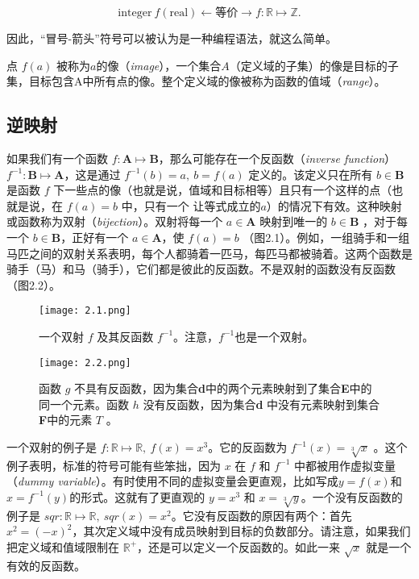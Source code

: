 \documentclass[lang=cn,12pt]{elegantbook}
\begin{document}
$$\text{integer} \ f(\text{real}) \leftarrow \text{等价} \rightarrow f : \mathbb{R} \mapsto \mathbb{Z}.$$

因此，“冒号-箭头”符号可以被认为是一种编程语法，就这么简单。

点 $f(a)$ 被称为$a$的像（\textit{image}），一个集合$A$（定义域的子集）的像是目标的子集，目标包含A中所有点的像。整个定义域的像被称为函数的值域（\textit{range}）。

\subsection{逆映射}

如果我们有一个函数 $f : \textbf{A} \mapsto \textbf{B}$，那么可能存在一个反函数（\textit{inverse function}） $f^{-1} : \textbf{B} \mapsto \textbf{A}$，这是通过 $ f^{-1}(b) = a,\ b = f(a)$ 定义的。该定义只在所有 $b \in \textbf{B}$是函数 $f$ 下一些点的像（也就是说，值域和目标相等）且只有一个这样的点（也就是说，在 $f(a) = b$ 中，只有一个 让等式成立的$a$）的情况下有效。这种映射或函数称为双射（\textit{bijection}）。双射将每一个 $a \in \textbf{A}$ 映射到唯一的 $b \in \textbf{B}$ ，对于每一个 $b \in \textbf{B}$，正好有一个 $a \in \textbf{A}$，使 $f(a)=b$ （图2.1）。例如，一组骑手和一组马匹之间的双射关系表明，每个人都骑着一匹马，每匹马都被骑着。这两个函数是骑手（马）和马（骑手），它们都是彼此的反函数。不是双射的函数没有反函数（图2.2）。

\begin{figure}[htb]
  \centering
  \begin{minipage}[t]{0.4\textwidth}
    \centering
    \texttt{[image: 2.1.png]}
    \caption{一个双射 $f$ 及其反函数 $f^{-1}$。注意，$f^{-1}$也是一个双射。}
  \end{minipage}
  \hspace*{2em}
  \begin{minipage}[t]{0.4\textwidth}
    \centering
    \texttt{[image: 2.2.png]}
    \caption{函数 $g$ 不具有反函数，因为集合\textbf{d}中的两个元素映射到了集合\textbf{E}中的同一个元素。函数 $h$ 没有反函数，因为集合\textbf{d} 中没有元素映射到集合\textbf{F}中的元素 $T$ 。}
  \end{minipage}
\end{figure}

一个双射的例子是 $f : \mathbb{R} \mapsto \mathbb{R},\ f(x) = x^3$。它的反函数为 $f^{-1}(x) = \sqrt[3]{x}$ 。这个例子表明，标准的符号可能有些笨拙，因为 $x$ 在 $f$ 和 $f^{-1}$ 中都被用作虚拟变量（\textit{dummy variable}）。有时使用不同的虚拟变量会更直观，比如写成$y = f(x)$和$x=f^{-1}(y)$的形式。这就有了更直观的 $y = x^3$ 和 $x = \sqrt[3]{y}$。一个没有反函数的例子是 $sqr : \mathbb{R} \mapsto \mathbb{R},\ sqr(x) = x^2$。它没有反函数的原因有两个：首先 $x^2 = (-x)^2$，其次定义域中没有成员映射到目标的负数部分。请注意，如果我们把定义域和值域限制在 $\mathbb{R^+}$，还是可以定义一个反函数的。如此一来 $\sqrt{x}$ 就是一个有效的反函数。
\end{document}
